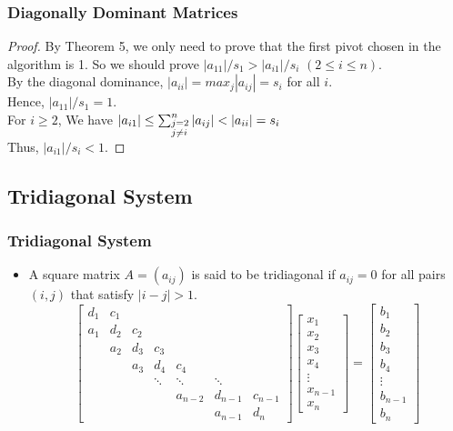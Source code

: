 \documentclass[notheorems,mathserif,table,compress]{beamer}  %
\begin{document}
\begin{frame}
\frametitle{Diagonally Dominant Matrices}
\begin{proof}
By Theorem 5, we only need to prove that the first pivot chosen in the algorithm is 1. So we should prove
$|a_{11}|/s_{1}>|a_{i1}|/s_{i}$ \quad $(2\leq i \leq n)$.\\
By the diagonal dominance, $|a_{ii}|=max_{j}|a_{ij}|=s_{i}$ for all $i$. \\
Hence, $|a_{11}|/s_{1}=1$.\\
For $i\geq2$, We have $|a_{i1}|\leq \sum_{\begin{subarray}{l}
{j=2}\\
j\neq i
\end{subarray}}^n|a_{ij}|<|a_{ii}|=s_{i}$\\
Thus, $|a_{i1}|/s_{i}<1$.
\end{proof}
\end{frame}

\subsection{Tridiagonal System}

\begin{frame}
\frametitle{Tridiagonal System} 
\begin{itemize}
\item A square matrix $A=(a_{ij})$ is said to be tridiagonal if $a_{ij}=0$ for all pairs $(i,j)$ that satisfy $|i-j|>1$.
\begin{displaymath}
\begin{bmatrix}
d_1 & c_1 &     &     &     &   & \\
a_1 & d_2 & c_2 &     &     &   & \\
    & a_2 & d_3 & c_3 &     &   & \\
    &     & a_3 & d_4 & c_4 &   &  \\
    &     &     & \ddots &\ddots& \ddots & \\
    &     &     &     &a_{n-2}&   d_{n-1}     & c_{n-1}\\
    &     &     &     &     &   a_{n-1} & d_n
\end{bmatrix}
\begin{bmatrix}
x_1\\
x_2\\
x_3\\
x_4\\
\vdots\\
x_{n-1}\\
x_n
\end{bmatrix}
=\begin{bmatrix}
b_1\\
b_2\\
b_3\\
b_4\\
\vdots\\
b_{n-1}\\
b_n
\end{bmatrix}
\end{displaymath}

\end{itemize}
\end{frame}
\end{document}
